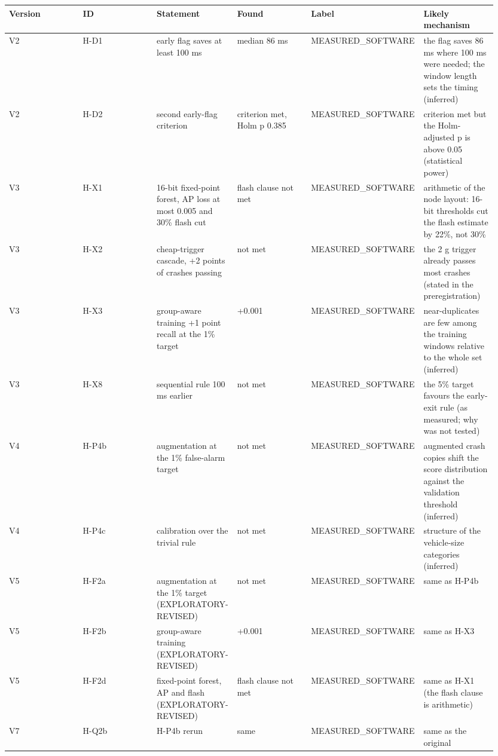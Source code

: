 {\scriptsize\raggedright
\begin{longtable}{p{0.158\linewidth}p{0.158\linewidth}p{0.158\linewidth}p{0.158\linewidth}p{0.158\linewidth}p{0.158\linewidth}}
\toprule
Version & ID & Statement & Found & Label & Likely mechanism \\
\midrule
\endhead
V2 & H-D1 & early flag saves at least 100 ms & median 86 ms & MEASURED\_SOFTWARE & the flag saves 86 ms where 100 ms were needed; the window length sets the timing (inferred) \\
V2 & H-D2 & second early-flag criterion & criterion met, Holm p 0.385 & MEASURED\_SOFTWARE & criterion met but the Holm-adjusted p is above 0.05 (statistical power) \\
V3 & H-X1 & 16-bit fixed-point forest, AP loss at most 0.005 and 30\% flash cut & flash clause not met & MEASURED\_SOFTWARE & arithmetic of the node layout: 16-bit thresholds cut the flash estimate by 22\%, not 30\% \\
V3 & H-X2 & cheap-trigger cascade, +2 points of crashes passing & not met & MEASURED\_SOFTWARE & the 2 g trigger already passes most crashes (stated in the preregistration) \\
V3 & H-X3 & group-aware training +1 point recall at the 1\% target & +0.001 & MEASURED\_SOFTWARE & near-duplicates are few among the training windows relative to the whole set (inferred) \\
V3 & H-X8 & sequential rule 100 ms earlier & not met & MEASURED\_SOFTWARE & the 5\% target favours the early-exit rule (as measured; why was not tested) \\
V4 & H-P4b & augmentation at the 1\% false-alarm target & not met & MEASURED\_SOFTWARE & augmented crash copies shift the score distribution against the validation threshold (inferred) \\
V4 & H-P4c & calibration over the trivial rule & not met & MEASURED\_SOFTWARE & structure of the vehicle-size categories (inferred) \\
V5 & H-F2a & augmentation at the 1\% target (EXPLORATORY-REVISED) & not met & MEASURED\_SOFTWARE & same as H-P4b \\
V5 & H-F2b & group-aware training (EXPLORATORY-REVISED) & +0.001 & MEASURED\_SOFTWARE & same as H-X3 \\
V5 & H-F2d & fixed-point forest, AP and flash (EXPLORATORY-REVISED) & flash clause not met & MEASURED\_SOFTWARE & same as H-X1 (the flash clause is arithmetic) \\
V7 & H-Q2b & H-P4b rerun & same & MEASURED\_SOFTWARE & same as the original \\

\end{longtable}}
